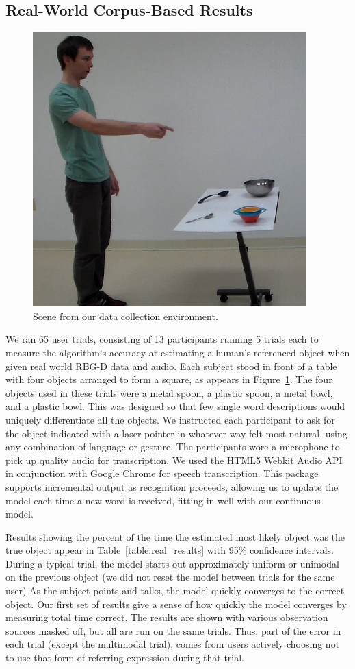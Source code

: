 \documentclass[a4paper, 11pt]{article} %
\begin{document}
\subsection{Real-World Corpus-Based Results}
\begin{figure}
\centering
\includegraphics[width=0.5\linewidth]{images/dataset.png}
\caption{Scene from our data collection environment.\label{fig:corpus_scene}}
\end{figure}

We ran 65 user trials, consisting of 13 participants running 5 trials each to measure the algorithm's accuracy at estimating a human's referenced object when given real world RBG-D data and audio. Each subject stood in front of a table with four objects arranged to form a square, as appears in Figure~\ref{fig:corpus_scene}. The four objects used in these trials were a metal spoon, a plastic spoon, a metal bowl, and a plastic bowl. This was designed so that few single word descriptions would uniquely differentiate all the objects. We instructed each participant to ask for the object indicated with a laser pointer in whatever way felt most natural, using any combination of language or gesture. The participants wore a microphone to pick up quality audio for transcription. We used the HTML5 Webkit Audio API in conjunction with Google Chrome for speech transcription. This package supports incremental output as recognition proceeds, allowing us to update the model each time a new word is received, fitting in well with our continuous model.

Results showing the percent of the time the estimated most likely
object was the true object appear in Table~\ref{table:real_results}
with 95\% confidence intervals. During a typical trial, the model
starts out approximately uniform or unimodal on the previous object
(we did not reset the model between trials for the same user) As the subject points and
talks, the model quickly converges to the correct object.  Our first
set of results give a sense of how quickly the model converges by measuring total time correct. The results are shown with various observation sources masked off, but all are run on the same trials. Thus, part of the error in each trial (except the multimodal trial), comes from users actively choosing not to use that form of referring expression during that trial.
\end{document}
